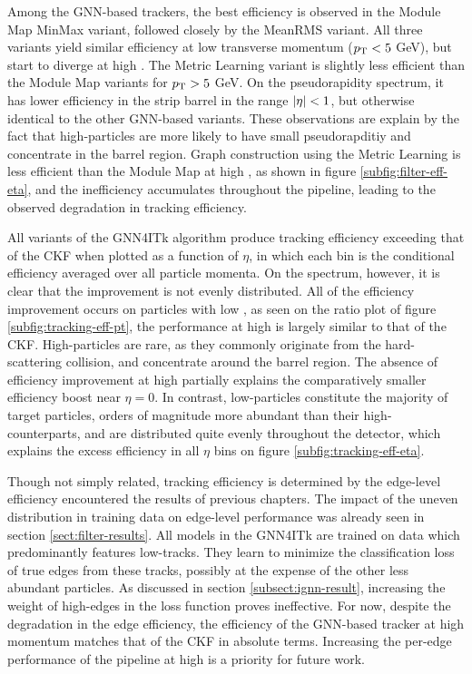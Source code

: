Among the GNN-based trackers, the best efficiency is observed in the {{Module Map MinMax}} variant, followed closely by the {{MeanRMS}} variant.
All three variants yield similar efficiency at low transverse momentum ($p_{\text{T}}<5$ GeV), but start to diverge at high \pT.
The {{Metric Learning}} variant is slightly less efficient than the Module Map variants for $p_{\text{T}} > 5$ GeV.
On the pseudorapidity spectrum, it has lower efficiency in the strip barrel in the range $\abs{\eta}<1$, but otherwise identical to the other GNN-based variants.
These observations are explain by the fact that high-\pT particles are more likely to have small pseudorapditiy and concentrate in the barrel region.
Graph construction using the Metric Learning is less efficient than the Module Map at high \pT, as shown in figure \ref{subfig:filter-eff-eta}, and the inefficiency accumulates throughout the pipeline,
leading to the observed degradation in tracking efficiency. 

All variants of the GNN4ITk algorithm produce tracking efficiency exceeding that of the CKF when plotted as a function of $\eta$, in which each bin is the conditional efficiency averaged over all particle momenta. 
On the \pT spectrum, however, it is clear that the improvement is not evenly distributed. 
All of the efficiency improvement occurs on particles with low \pT, as seen on the ratio plot of figure \ref{subfig:tracking-eff-pt}, the performance at high \pT is largely similar to that of the CKF.
High-\pT particles are rare, as they commonly originate from the hard-scattering collision, and concentrate around the barrel region.
The absence of efficiency improvement at high \pT partially explains the comparatively smaller efficiency boost near $\eta=0$. 
In contrast, low-\pT particles constitute the majority of target particles, orders of magnitude more abundant than their high-\pT counterparts, 
and are distributed quite evenly throughout the detector, which explains the excess efficiency in all $\eta$ bins on figure \ref{subfig:tracking-eff-eta}. 

Though not simply related, tracking efficiency is determined by the edge-level efficiency encountered the results of previous chapters.
The impact of the uneven \pT distribution in training data on edge-level performance was already seen in section \ref{sect:filter-results}. 
All models in the GNN4ITk are trained on data which predominantly features low-\pT tracks. 
They learn to minimize the classification loss of true edges from these tracks, possibly at the expense of the other less abundant particles.
As discussed in section \ref{subsect:ignn-result}, increasing the weight of high-\pT edges in the loss function proves ineffective.
For now, despite the degradation in the edge efficiency, the efficiency of the GNN-based tracker at high momentum matches that of the CKF in absolute terms. 
Increasing the per-edge performance of the pipeline at high \pT is a priority for future work.

